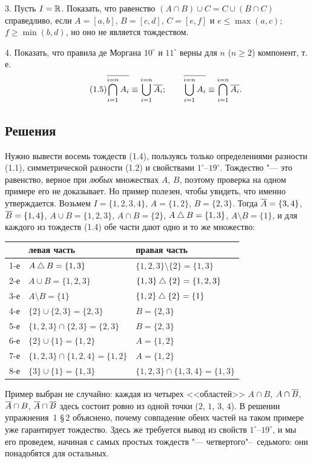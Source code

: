 3. Пусть $I=\mathbb R$. Показать, что равенство
$(A\cap B)\cup C=C\cup(B\cap C)$ справедливо, если $A=[a,b]$, $B=[c,d]$,
$C=[e,f]$ и $e\le\max(a,c)$; $f\ge\min(b,d)$, но оно не является
тождеством.

4. Показать, что правила де Моргана $10^\circ$ и $11^\circ$ верны для
$n$ ($n\ge2$) компонент, т.\,е.
\begin{equation}\tag{1.5}
\overline{\bigcap_{i=1}^{i=n}A_i}\equiv\bigcup_{i=1}^{i=n}\overline{A_i};\qquad
\overline{\bigcup_{i=1}^{i=n}A_i}\equiv\bigcap_{i=1}^{i=n}\overline{A_i}.
\end{equation}

\subsection*{Решения}

\begin{solution}[1 (\S\,1)]
Нужно вывести восемь тождеств (1.4), пользуясь только определениями
разности (1.1), симметрической разности (1.2) и свойствами
$1^\circ$--$19^\circ$. Тождество "--- это равенство, верное при
\emph{любых} множествах $A$, $B$, поэтому проверка на одном примере его не
доказывает. Но пример полезен, чтобы увидеть, что именно утверждается.
Возьмем $I=\{1,2,3,4\}$, $A=\{1,2\}$, $B=\{2,3\}$. Тогда
$\overline{A}=\{3,4\}$, $\overline{B}=\{1,4\}$, $A\cup B=\{1,2,3\}$, $A\cap B=\{2\}$,
$A\mathbin{\triangle} B=\{1,3\}$, $A\setminus B=\{1\}$, и для каждого из тождеств (1.4)
обе части дают одно и то же множество:
\begin{center}\small
\begin{tabular}{@{}lll@{}}
\toprule
& левая часть & правая часть\\ \midrule
1-е & $A\mathbin{\triangle} B=\{1,3\}$ & $\{1,2,3\}\setminus\{2\}=\{1,3\}$\\
2-е & $A\cup B=\{1,2,3\}$ & $\{1,3\}\mathbin{\triangle}\{2\}=\{1,2,3\}$\\
3-е & $A\setminus B=\{1\}$ & $\{1,2\}\mathbin{\triangle}\{2\}=\{1\}$\\
4-е & $\{2\}\cup\{2,3\}=\{2,3\}$ & $B=\{2,3\}$\\
5-е & $\{1,2,3\}\cap\{2,3\}=\{2,3\}$ & $B=\{2,3\}$\\
6-е & $\{2\}\cup\{1\}=\{1,2\}$ & $A=\{1,2\}$\\
7-е & $\{1,2,3\}\cap\{1,2,4\}=\{1,2\}$ & $A=\{1,2\}$\\
8-е & $\{3\}\cup\{1\}=\{1,3\}$ & $\{1,2,3\}\cap\{1,3,4\}=\{1,3\}$\\
\bottomrule
\end{tabular}
\end{center}
Пример выбран не случайно: каждая из четырех <<областей>> $A\cap B$,
$A\cap\overline{B}$, $\overline{A}\cap B$, $\overline{A}\cap\overline{B}$ здесь состоит ровно из одной
точки ($2$, $1$, $3$, $4$). В решении упражнения~1 \S\,2 объяснено, почему
совпадение обеих частей на таком примере уже гарантирует тождество.
Здесь же требуется вывод из свойств $1^\circ$--$19^\circ$, и мы его
проведем, начиная с самых простых тождеств "--- четвертого"--~седьмого:
они понадобятся для остальных.


\end{solution}
